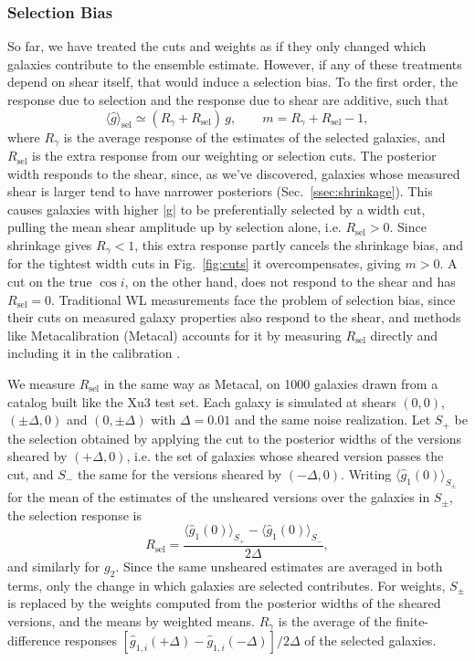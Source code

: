 \subsubsection{Selection Bias}
\label{sssec:selection}

So far, we have treated the cuts and weights as if they only changed which galaxies contribute to the ensemble estimate. However, if any of these treatments depend on shear itself, that would induce a selection bias. To the first order, the response due to selection and the response due to shear are additive, such that
\begin{equation}
\label{eqn:selection-response}
    \langle\hat{g}\rangle_\mathrm{sel} \simeq (R_\gamma + R_\mathrm{sel})\, g, \qquad m = R_\gamma + R_\mathrm{sel} - 1,
\end{equation}
where $R_\gamma$ is the average response of the estimates of the selected galaxies, and $R_\mathrm{sel}$ is the extra response from our weighting or selection cuts. The posterior width responds to the shear, since, as we've discovered, galaxies whose measured shear is larger tend to have narrower posteriors (Sec.~\ref{ssec:shrinkage}). This causes galaxies with higher |g| to be preferentially selected by a width cut, pulling the mean shear amplitude up by selection alone, i.e. $R_\mathrm{sel} > 0$. Since shrinkage gives $R_\gamma < 1$, this extra response partly cancels the shrinkage bias, and for the tightest width cuts in Fig.~\ref{fig:cuts} it overcompensates, giving $m > 0$. A cut on the true $\cos i$, on the other hand, does not respond to the shear and has $R_\mathrm{sel} = 0$. Traditional WL measurements face the problem of selection bias, since their cuts on measured galaxy properties also respond to the shear, and methods like Metacalibration (Metacal) accounts for it by measuring $R_\mathrm{sel}$ directly and including it in the calibration \citep{MetacalPractical, Metadet}.

We measure $R_\mathrm{sel}$ in the same way as Metacal, on 1000 galaxies drawn from a catalog built like the Xu3 test set. Each galaxy is simulated at shears $(0,0)$, $(\pm\Delta, 0)$ and $(0, \pm\Delta)$ with $\Delta = 0.01$ and the same noise realization. Let $S_+$ be the selection obtained by applying the cut to the posterior widths of the versions sheared by $(+\Delta, 0)$, i.e. the set of galaxies whose sheared version passes the cut, and $S_-$ the same for the versions sheared by $(-\Delta, 0)$. Writing $\langle \hat{g}_1(0) \rangle_{S_\pm}$ for the mean of the estimates of the unsheared versions over the galaxies in $S_\pm$, the selection response is
\begin{equation}
\label{eqn:rsel}
    R_\mathrm{sel} = \frac{\langle \hat{g}_1(0) \rangle_{S_+} - \langle \hat{g}_1(0) \rangle_{S_-}}{2\Delta},
\end{equation}
and similarly for $g_2$. Since the same unsheared estimates are averaged in both terms, only the change in which galaxies are selected contributes. For weights, $S_\pm$ is replaced by the weights computed from the posterior widths of the sheared versions, and the means by weighted means. $R_\gamma$ is the average of the finite-difference responses $[\hat{g}_{1,i}(+\Delta) - \hat{g}_{1,i}(-\Delta)]/2\Delta$ of the selected galaxies.

